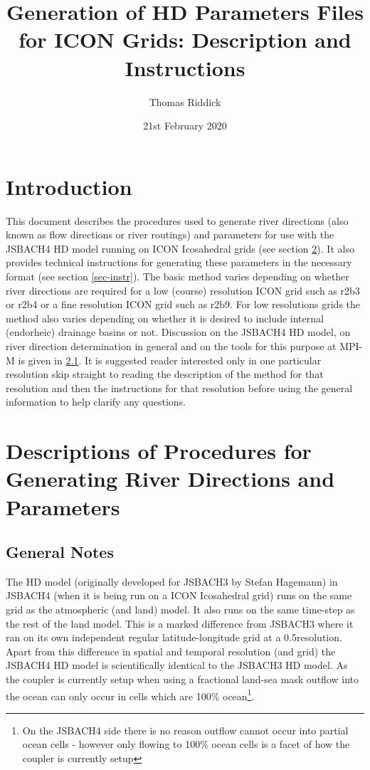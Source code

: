 \documentclass{article}
\title{Generation of HD Parameters Files for ICON Grids: Description and Instructions}
\author{Thomas Riddick}
\date{21st February 2020}
\begin{document}
\maketitle
\tableofcontents
\newpage
\lstset{language=bash}
\section{Introduction}
This document describes the procedures used to generate river directions (also known as flow directions or river routings) and parameters for use with the JSBACH4 HD model running on ICON Icosahedral grids (see section \ref{sec-desc}). It also provides technical instructions for generating these parameters in the necessary format (see section \ref{sec-instr}). The basic method varies depending on whether river directions are required for a low (course) resolution ICON grid such as r2b3 or r2b4 or a fine resolution ICON grid such as r2b9. For low resolutions grids the method also varies depending on whether it is desired to include internal (endorheic) drainage basins or not. Discussion on the JSBACH4 HD model, on river direction determination in general and on the tools for this purpose at MPI-M is given in \ref{sub-sec-desc-gen-notes}. It is suggested reader interested only in one particular resolution skip straight to reading the description of the method for that resolution and then the instructions for that resolution before using the general information to help clarify any questions.
\section{Descriptions of Procedures for Generating River Directions and Parameters} \label{sec-desc}
\subsection{General Notes} \label{sub-sec-desc-gen-notes}
The HD model (originally developed for JSBACH3 by Stefan Hagemann\cite{Hagemann:1998aa,Hagemann:1998ab,JGRD:JGRD8049}) in JSBACH4 (when it is being run on a ICON Icosahedral grid) runs on the same grid as the atmospheric (and land) model. It also runs on the same time-step as the rest of the land model. This is a marked difference from JSBACH3 where it ran on its own independent regular latitude-longitude grid at a 0.5\degree resolution. Apart from this difference in spatial and temporal resolution (and grid) the JSBACH4 HD model is scientifically identical to the JSBACH3 HD model. As the coupler is currently setup when using a fractional land-sea mask outflow into the ocean can only occur in cells which are 100\% ocean\footnote{On the JSBACH4 side there is no reason outflow cannot occur into partial ocean cells - however only flowing to 100\% ocean cells is a facet of how the coupler is currently setup}. 
\end{document}
